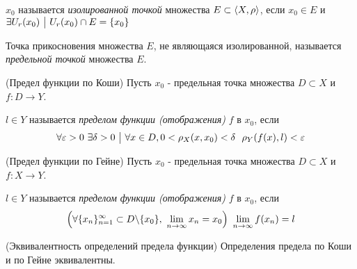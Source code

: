 \begin{definition}
	$x_0$ называется \textit{изолированной точкой} множества $E \subset \left\langle X, \rho\right\rangle$, если $x_0 \in E$ и $\exists U_r(x_0) \ \big|\  U_r(x_0) \cap E = \{x_0\}$
\end{definition}

\begin{definition}
	Точка прикосновения множества $E$, не являющаяся изолированной, называется \textit{предельной точкой} множества $E$.
\end{definition}

\begin{definition} (Предел функции по Коши)
	Пусть $x_0$ - предельная точка множества $D \subset X$ и $f: D \to Y$.
	
	$l \in Y$ называется \textit{пределом функции (отображения)} $f$ в $x_0$, если
	\[
		\forall \eps > 0\ \exists \delta > 0 \such \forall x \in D, 0 < \rho_X(x, x_0) < \delta\ \ \rho_Y(f(x), l) < \eps
	\]
\end{definition}

\begin{definition} (Предел функции по Гейне)
	Пусть $x_0$ - предельная точка множества $D \subset X$ и $f: X \to Y$.
	
	$l \in Y$ называется \textit{пределом функции (отображения)} $f$ в $x_0$, если
	\[
		\left(\forall \{x_n\}_{n = 1}^\infty \subset D \backslash \{x_0\},\ \lim\limits_{n \to \infty} x_n = x_0\right)\ \lim\limits_{n \to \infty} f(x_n) = l
	\]
\end{definition}

\begin{theorem} (Эквивалентность определений предела функции)
	Определения предела по Коши и по Гейне эквивалентны.
\end{theorem}

